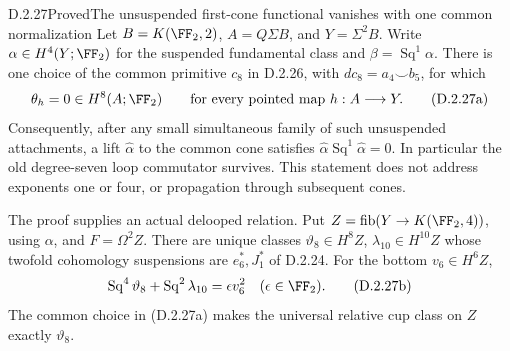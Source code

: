\begin{claim}{D.2.27}{Proved}{The unsuspended first-cone functional vanishes with one common normalization}
Let $B=K(\FF_2,2)$, $A=Q\Sigma B$, and $Y=\Sigma^2B$.
Write $\alpha\in H^4(Y;\FF_2)$ for the suspended fundamental
class and $\beta=\operatorname{Sq}^1\alpha$.
There is one choice of the common primitive $c_8$ in
\textup{D.2.26}, with $dc_8=a_4\smile b_5$, for which
\[
 \theta_h=0\in H^8(A;\FF_2)
 \qquad\text{for every pointed map }h:A\longrightarrow Y.
 \tag{D.2.27a}
\]
Consequently, after any small simultaneous family of such
unsuspended attachments, a lift $\widehat\alpha$ to the common
cone satisfies
$\widehat\alpha\operatorname{Sq}^1\widehat\alpha=0$.
In particular the old degree-seven loop commutator survives.
This statement does not address exponents one or four, or
propagation through subsequent cones.

The proof supplies an actual delooped relation. Put
$Z=\operatorname{fib}(Y\to K(\FF_2,4))$, using $\alpha$,
and $F=\Omega^2Z$. There are unique classes
$\vartheta_8\in H^8Z$, $\lambda_{10}\in H^{10}Z$ whose
twofold cohomology suspensions are $e_6^*,J_1^*$ of
\textup{D.2.24}. For the bottom $v_6\in H^6Z$,
\[
 \operatorname{Sq}^4\vartheta_8+
 \operatorname{Sq}^2\lambda_{10}
       =\epsilon v_6^2\quad(\epsilon\in\FF_2).
 \tag{D.2.27b}
\]
The common choice in \textup{(D.2.27a)} makes the universal
relative cup class on $Z$ exactly $\vartheta_8$.
\end{claim}
